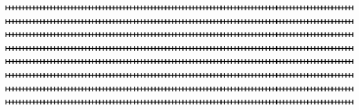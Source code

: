 \newpage
\thispagestyle{empty}
\begin{center}
	\includegraphics[angle=90]{100}
	\hspace{2cm}\includegraphics[angle=90]{100}
	\hspace{2cm}\includegraphics[angle=90]{100}
	\hspace{2cm}\includegraphics[angle=90]{100}
	\hspace{2cm}\includegraphics[angle=90]{100}
	\hspace{2cm}\includegraphics[angle=90]{100}
	\hspace{2cm}\includegraphics[angle=90]{100}
	\hspace{2cm}\includegraphics[angle=90]{100}
\end{center}
